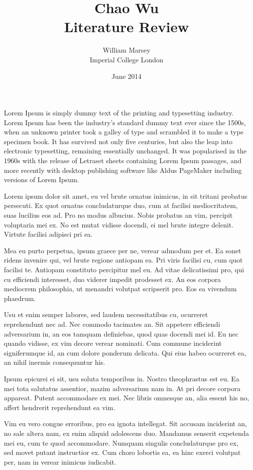 \documentclass[a4paper,11pt,twoside,notitlepage]{report}
\renewenvironment{abstract}
 {
	\small
  	\begin{center}
  	\bfseries \abstractname\vspace{-.5em}\vspace{0pt}
  	\end{center}
  	\list{}{
    	\setlength{\leftmargin}{.5cm}%
    	\setlength{\rightmargin}{\leftmargin}%
  	}%
  	\item\relax}
 	{\endlist}
\begin{document}
	\title{Chao Wu
		\\ \small Literature Review}
	\author{William Marsey
		\\Imperial College London}
	\date{June 2014}
 	\maketitle
	

	\begin{framed}
		\begin{abstract}
			Lorem Ipsum is simply dummy text of the printing and typesetting industry. Lorem Ipsum has been the industry's standard dummy text ever since the 1500s, when an unknown printer took a galley of type and scrambled it to make a type specimen book. It has survived not only five centuries, but also the leap into electronic typesetting, remaining essentially unchanged. It was popularised in the 1960s with the release of Letraset sheets containing Lorem Ipsum passages, and more recently with desktop publishing software like Aldus PageMaker including versions of Lorem Ipsum.
		\end{abstract}
	\end{framed}

	Lorem ipsum dolor sit amet, eu vel brute ornatus inimicus, in sit tritani probatus persecuti. Ex quot ornatus concludaturque duo, cum at facilisi mediocritatem, suas lucilius eos ad. Pro no modus albucius. Nobis probatus an vim, percipit voluptaria mei ex. No est mutat vidisse docendi, ei mel brute integre delenit. Virtute facilisi adipisci pri ea.~\cite{Nobody06}

	Mea eu purto perpetua, ipsum graece per ne, verear admodum per et. Ea sonet ridens invenire qui, vel brute regione antiopam ea. Pri viris facilisi cu, cum quot facilisi te. Antiopam constituto percipitur mel eu. Ad vitae delicatissimi pro, qui cu efficiendi interesset, duo viderer impedit prodesset ex. An eos corpora mediocrem philosophia, ut menandri volutpat scripserit pro. Eos ea vivendum phaedrum.

	Usu et enim semper labores, sed laudem necessitatibus cu, ocurreret reprehendunt nec ad. Nec commodo tacimates an. Sit appetere efficiendi adversarium in, an eos tamquam definiebas, quod quas docendi mei id. Eu nec quando vidisse, ex vim decore verear nominati. Cum commune inciderint signiferumque id, an cum dolore ponderum delicata. Qui eius habeo ocurreret ea, an nihil inermis consequuntur his.

	Ipsum epicurei ei sit, usu soluta temporibus in. Nostro theophrastus est eu. Ea mei tota salutatus assentior, mazim adversarium nam in. At pri decore corpora appareat. Putent accommodare ex mei. Nec libris omnesque an, alia essent his no, affert hendrerit reprehendunt ea vim.

	Vim eu vero congue erroribus, pro ea ignota intellegat. Sit accusam inciderint an, no sale altera nam, ex enim aliquid adolescens duo. Mandamus senserit expetenda mei eu, cum te quod accommodare. Numquam singulis concludaturque pro ex, sed movet putant instructior ex. Cum choro lobortis ea, ea hinc exerci volutpat per, nam in verear inimicus iudicabit.

{}
	
\end{document}
